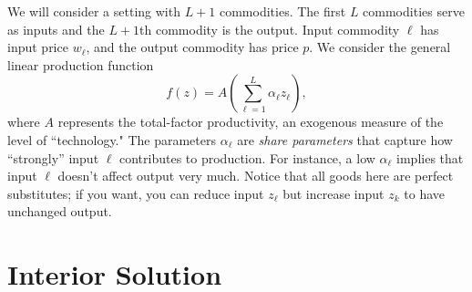 \documentclass[12pt]{article}
\theoremstyle{definition}
\begin{document}
\maketitle
\onehalfspace



We will consider a setting with $L+1$ commodities. The first $L$ commodities serve as inputs and the $L+1$th commodity is the output. Input commodity $\ell$ has input price $w_{\ell}$, and the output commodity has price $p$. We consider the general linear production function
	\[	f(z)=A \left(\sum_{\ell = 1}^L \alpha_{\ell} z_{\ell} \right),\]
where $A$ represents the total-factor productivity, an exogenous measure of the level of ``technology." The parameters $\alpha_{\ell}$ are \emph{share parameters} that capture how ``strongly'' input $\ell$ contributes to production. For instance, a low $\alpha_{\ell}$ implies that input $\ell$ doesn't affect output very much. Notice that all goods here are perfect substitutes; if you want, you can reduce input $z_{\ell}$ but increase input $z_{k}$ to have unchanged output. 



\section{Interior Solution}
\end{document}
